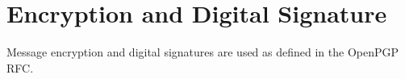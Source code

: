 \section{Encryption and Digital Signature}
Message encryption and digital signatures are
used as defined in the OpenPGP RFC.\cite{rfc2440}

